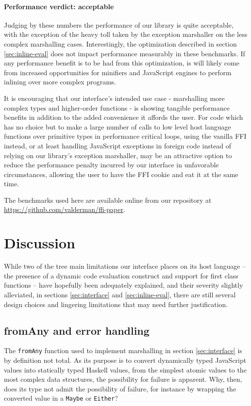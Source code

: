 \documentclass{sigplanconf}
\begin{document}
\paragraph{Performance verdict: acceptable}
Judging by these numbers the performance of our library is quite acceptable,
with the exception of the heavy toll taken by the exception marshaller on
the less complex marshalling cases.
Interestingly, the optimization described in section \ref{sec:inline-eval}
does not impact performance measurably in these benchmarks. If any
performance benefit is to be had from this optimization, is will likely come
from increased opportunities for minifiers and JavaScript engines to perform
inlining over more complex programs.

It is encouraging that our interface's intended use case - marshalling
more complex types and higher-order functions - is showing tangible performance
benefits in addition to the added convenience it affords the user.
For code which has no choice but to make a large number of calls to
low level host language functions over primitive types in performance critical
loops, using the vanilla FFI instead, or at least handling JavaScript
exceptions in foreign code instead of relying on our library's exception
marshaller, may be an attractive option to
reduce the performance penalty incurred by our interface in unfavorable circumstances,
allowing the user to have the FFI cookie and eat it at the same time.

The benchmarks used here are available online from our repository at
\url{https://github.com/valderman/ffi-paper}.

\section{Discussion}\label{sec:discussion}
While two of the tree main limitations our interface places on its host
language -- the presence of a dynamic code evaluation construct and support for
first class functions -- have hopefully been adequately explained, and their
severity slightly alleviated, in sections \ref{sec:interface} and
\ref{sec:inline-eval}, there are still several design choices and lingering
limitations that may need further justification.

\subsection{fromAny and error handling}
The \lstinline!fromAny! function used to implement marshalling in section
\ref{sec:interface} is by definition not total. As its purpose is to
convert dynamically typed JavaScript values into statically typed Haskell
values, from the simplest atomic values to the most complex data structures,
the possibility for failure is apparent. Why, then, does its type not admit
the possibility of failure, for instance by wrapping the converted value in a
\lstinline!Maybe! or \lstinline!Either!?
\end{document}
